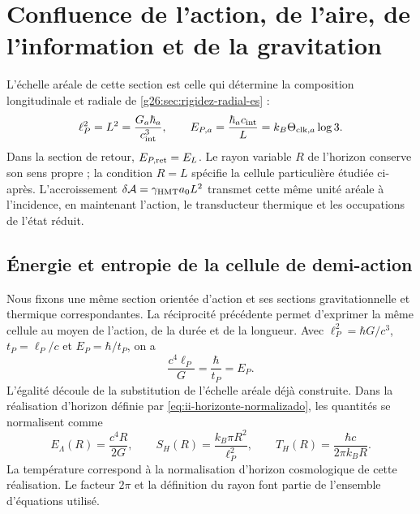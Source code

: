 \section{Confluence de l’action, de l’aire, de l’information et de la gravitation}
\label{sec:confluencia}

L’échelle aréale de cette section est celle qui détermine la
composition longitudinale et radiale de \ref{g26:sec:rigidez-radial-es} :
\begin{equation}
 \ell_P^2=L^2=\frac{G_a\hbar_a}{c_{\rm int}^3},\qquad
 E_{P,a}=\frac{\hbar_a c_{\rm int}}{L}
        =k_B\Theta_{{\rm clk},a}\log3.
 \label{eq:ii-g26-longitud-energia-area}
\end{equation}
Dans la section de retour, \(E_{P,\rm ret}=E_L\). Le rayon variable
\(R\) de l’horizon conserve son sens propre ; la condition
\(R=L\) spécifie la cellule particulière étudiée ci-après.
L’accroissement \(\delta\mathcal A=\gamma_{\mathrm{HMT}}a_0L^2\) transmet
cette même unité aréale à l’incidence, en maintenant l’action, le
transducteur thermique et les occupations de l’état réduit.

\subsection{Énergie et entropie de la cellule de demi-action}

Nous fixons une même section orientée d’action et ses sections
gravitationnelle et thermique correspondantes. La réciprocité précédente permet d’exprimer la même cellule au moyen de
l’action, de la durée et de la longueur. Avec
\(\ell_P^2=\hbar G/c^3\), \(t_P=\ell_P/c\) et
\(E_P=\hbar/t_P\), on a
\[
 \frac{c^4\ell_P}{G}=\frac{\hbar}{t_P}=E_P.
\]
L’égalité découle de la substitution de l’échelle aréale déjà construite. Dans la
réalisation d’horizon définie par \eqref{eq:ii-horizonte-normalizado}, les quantités
se normalisent comme
\begin{equation}
 E_\Lambda(R)=\frac{c^4R}{2G},\qquad
 S_H(R)=\frac{k_B\pi R^2}{\ell_P^2},\qquad
 T_H(R)=\frac{\hbar c}{2\pi k_BR}.
 \label{eq:ii-horizonte-normalizado}
\end{equation}
La température correspond à la normalisation d’horizon cosmologique
de cette réalisation. Le facteur \(2\pi\) et la définition du rayon
font partie de l’ensemble d’équations utilisé.

